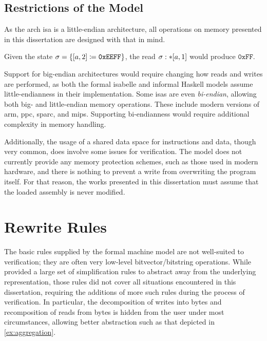 \subsection{Restrictions of the Model}
As the \gls{arch} \ac{isa} is a little-endian architecture,%
all operations on memory presented in this dissertation
are designed with that in mind.
\begin{example}
  Given the state $\sigma=\{[a,2]\coloneqq\mathtt{0xEEFF}\}$,
  the read $\sigma:\ast[a,1]$ would produce $\mathtt{0xFF}$.
\end{example}
Support for big-endian architectures would require changing how reads and writes%
are performed, as both the formal \gls{isabelle} and informal Haskell models
assume little-endianness in their implementation.
Some \acp{isa} are even \emph{bi-endian}, allowing both big- and little-endian%
memory operations. These include modern versions of \gls{arm}, \ac{ppc}, \ac{sparc}, and \ac{mips}.
Supporting bi-endianness would require additional complexity in memory handling.

Additionally,
the usage of a shared data space for instructions and data, though very common,
does involve some issues for verification.
The model does not currently provide any memory protection schemes,%
such as those used in modern hardware,
and there is nothing to prevent a write from overwriting the program itself.
For that reason, the works presented in this dissertation
must assume that the loaded assembly is never modified.

\section{Rewrite Rules}\label{se:rewrite}
The basic rules supplied by the formal machine model are not well-suited to verification;
they are often very low-level bitvector/bitstring operations.
While \textcite{roessle2019verified} provided a large set of simplification rules
to abstract away from the underlying representation,
those rules did not cover all situations encountered in this dissertation,
requiring the additions of more such rules during the process of verification.
In particular, the decomposition of writes into bytes
and recomposition of reads from bytes is hidden from the user under most circumstances,
allowing better abstraction such as that depicted in \cref{ex:aggregation}.

